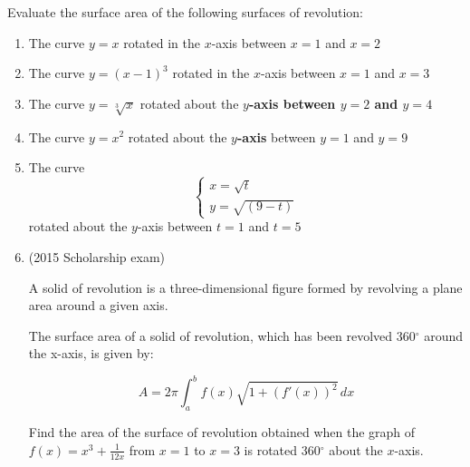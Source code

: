 \documentclass[../main.tex]{subfiles}
\begin{document}
Evaluate the surface area of the following surfaces of revolution:
\begin{enumerate}[itemsep=0.7cm]
    \item 
    The curve $y=x$ rotated in the $x$-axis between $x=1$ and $x=2$

    \item 
    The curve $y=(x-1)^3$ rotated in the $x$-axis between $x=1$ and $x=3$

    \item 
    The curve $y=\sqrt[3]{x}$ rotated about the \textbf{$y$-axis between $y=2$ and $y=4$}

    \item 
    The curve $y=x^2$ rotated about the \textbf{$y$-axis} between $y=1$ and $y=9$

    \item 
    The curve 
    \begin{equation*}
        \begin{cases}
            x=\sqrt{t}\\
            y=\sqrt{(9-t)}
        \end{cases}
    \end{equation*}
    rotated about the $y$-axis between $t=1$ and $t=5$

    \item 
    (2015 Scholarship exam)

    A solid of revolution is a three-dimensional figure formed by revolving a plane area around a given axis. 

    The surface area of a solid of revolution, which has been revolved 360$^\circ$ around the x-axis, is given by: 

    \[A=2\pi \int_a^b f(x)\sqrt{1+(f'(x))^2}\, dx\]

    Find the area of the surface of revolution obtained when the graph of $f(x)=x^3+\frac{1}{12x}$ from $x=1$ to $x=3$ is rotated 360$^\circ$ about the $x$-axis.

\end{enumerate}


\pagebreak
\end{document}
